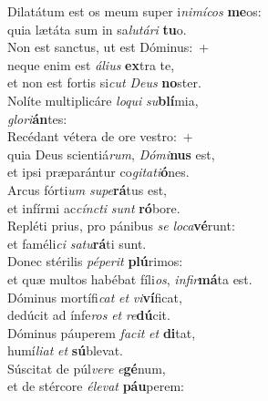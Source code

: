 \evenverse Dilatátum est os meum super i\textit{ni}\textit{mí}\textit{cos} \textbf{me}os:~\*\\
\evenverse quia lætáta sum in sa\textit{lu}\textit{tá}\textit{ri} \textbf{tu}o.\\
\oddverse Non est sanctus, ut est Dóminus:~+\\
\oddverse  neque enim est \textit{á}\textit{li}\textit{us} \textbf{ex}tra te,~\*\\
\oddverse et non est fortis si\textit{cut} \textit{De}\textit{us} \textbf{no}ster.\\
\evenverse Nolíte multiplicáre \textit{lo}\textit{qui} \textit{su}\textbf{blí}mia,~\*\\
\evenverse \textit{glo}\textit{ri}\textbf{án}tes:\\
\oddverse Recédant vétera de ore vestro:~+\\
\oddverse  quia Deus scientiá\textit{rum}, \textit{Dó}\textit{mi}\textbf{nus} est,~\*\\
\oddverse et ipsi præparántur co\textit{gi}\textit{ta}\textit{ti}\textbf{ó}nes.\\
\evenverse Arcus fórti\textit{um} \textit{su}\textit{pe}\textbf{rá}tus est,~\*\\
\evenverse et infírmi ac\textit{cín}\textit{cti} \textit{sunt} \textbf{ró}bore.\\
\oddverse Repléti prius, pro pánibus \textit{se} \textit{lo}\textit{ca}\textbf{vé}runt:~\*\\
\oddverse et faméli\textit{ci} \textit{sa}\textit{tu}\textbf{rá}ti sunt.\\
\evenverse Donec stérilis \textit{pé}\textit{pe}\textit{rit} \textbf{plú}rimos:~\*\\
\evenverse et quæ multos habébat fíli\textit{os}, \textit{in}\textit{fir}\textbf{má}ta est.\\
\oddverse Dóminus mortífi\textit{cat} \textit{et} \textit{vi}\textbf{ví}ficat,~\*\\
\oddverse dedúcit ad ínfe\textit{ros} \textit{et} \textit{re}\textbf{dú}cit.\\
\evenverse Dóminus páuperem \textit{fa}\textit{cit} \textit{et} \textbf{di}tat,~\*\\
\evenverse humí\textit{li}\textit{at} \textit{et} \textbf{sú}blevat.\\
\oddverse Súscitat de púl\textit{ve}\textit{re} \textit{e}\textbf{gé}num,~\*\\
\oddverse et de stércore \textit{é}\textit{le}\textit{vat} \textbf{páu}perem:\\
